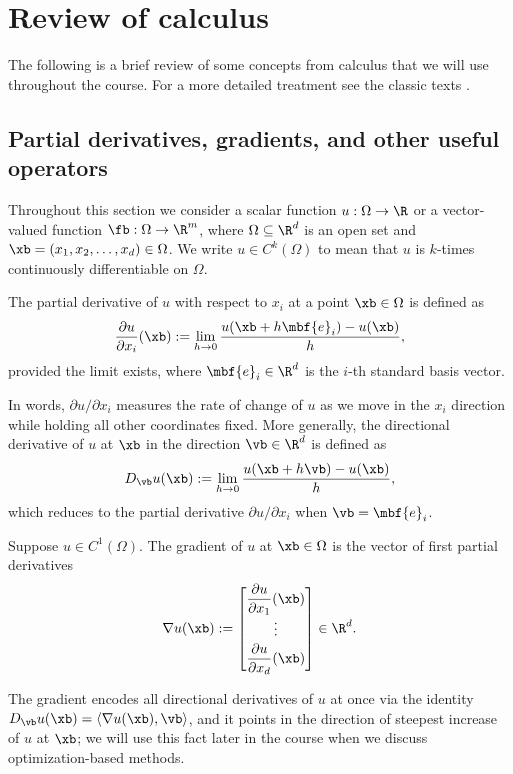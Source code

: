 \chapter{Review of calculus}
\label{ch:Lec-1-calculus}

The following is a brief review of some concepts from 
calculus that we will use throughout the course. 
For a more detailed treatment see the classic texts 
\cite{apostol1991calculus-1,apostol1991calculus-2, babyrudin}.


\section{Partial derivatives, gradients, and other useful operators}

Throughout this section we consider a scalar function $u: \Omega \to \R$
or a vector-valued function $\fb: \Omega \to \R^m$, where $\Omega
\subseteq \R^d$ is an open set and $\xb = (x_1, x_2, \ldots, x_d) \in
\Omega$. We write $u \in C^k(\Omega)$ to mean that $u$ is $k$-times
continuously differentiable on $\Omega$.

\begin{definition}
    The partial derivative of $u$ with respect to $x_i$ at a point
    $\xb \in \Omega$ is defined as
    \begin{equation*}
        \frac{\partial u}{\partial x_i}(\xb) :=
        \lim_{h \to 0} \frac{u(\xb + h \mbf{e}_i) - u(\xb)}{h},
    \end{equation*}
    provided the limit exists, where $\mbf{e}_i \in \R^d$ is the $i$-th
    standard basis vector.
\end{definition}
In words, $\partial u/\partial x_i$ measures the rate of change of $u$
as we move in the $x_i$ direction while holding all other coordinates
fixed. More generally, the directional derivative of $u$ at $\xb$ in the
direction $\vb \in \R^d$ is defined as
\begin{equation*}
    D_\vb u(\xb) := \lim_{h \to 0} \frac{u(\xb + h\vb) - u(\xb)}{h},
\end{equation*}
which reduces to the partial derivative $\partial u/\partial x_i$ when
$\vb = \mbf{e}_i$.

\begin{definition}[Gradient]
    Suppose $u \in C^1(\Omega)$. The gradient of $u$ at $\xb \in \Omega$
    is the vector of first partial derivatives
    \begin{equation*}
        \nabla u(\xb) :=
        \begin{bmatrix}
            \dfrac{\partial u}{\partial x_1}(\xb) \\[1ex]
            \vdots \\[0.5ex]
            \dfrac{\partial u}{\partial x_d}(\xb)
        \end{bmatrix} \in \R^d.
    \end{equation*}
\end{definition}
The gradient encodes all directional derivatives of $u$ at once via the
identity $D_\vb u(\xb) = \langle \nabla u(\xb), \vb \rangle$, and it
points in the direction of steepest increase of $u$ at $\xb$; we will
use this fact later in the course when we discuss optimization-based
methods.


